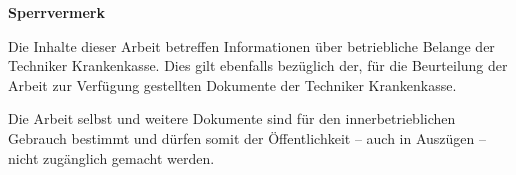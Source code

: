 \cleardoublepage
\thispagestyle{empty}
\Large\textbf{Sperrvermerk}


\normalsize
Die Inhalte dieser Arbeit betreffen Informationen über betriebliche Belange der Techniker Krankenkasse. Dies gilt ebenfalls bezüglich der, für die Beurteilung der Arbeit zur Verfügung gestellten Dokumente der Techniker Krankenkasse.

Die Arbeit selbst und weitere Dokumente sind für den innerbetrieblichen Gebrauch bestimmt und dürfen somit der Öffentlichkeit -- auch in Auszügen -- nicht zugänglich gemacht werden.
\vspace*{\fill}
